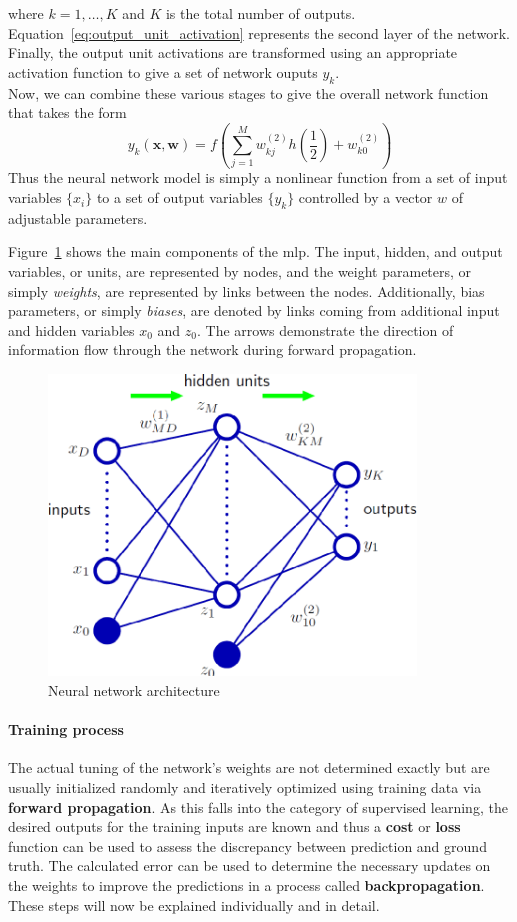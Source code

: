 where $ k = 1, \dots, K $ and $ K $ is the total number of outputs. Equation~\ref{eq:output_unit_activation} represents the second layer of the network. Finally, the output unit activations are transformed using an appropriate activation function to give a set of network ouputs $ y_k $. \\
Now, we can combine these various stages to give the overall network function that takes the form
\begin{equation}
	y_k(\pmb{x}, \pmb{w}) = f \left( \sum_{j=1}^{M} w_{kj}^{(2)} h \left( \frac{1}{2} \right) + w_{k0}^{(2)} \right)
\end{equation}
Thus the neural network model is simply a nonlinear function from a set of input variables $ \{x_i\} $ to a set of output variables $ \{y_k\} $ controlled by a vector $ w $ of adjustable parameters.

Figure~\ref{fig:neural_network_architecture} shows the main components of the \gls{mlp}. The input, hidden, and output variables, or units, are represented by nodes, and the weight parameters, or simply \textit{weights}, are represented by links between the nodes. Additionally, bias parameters, or simply \textit{biases}, are denoted by links coming from additional input and hidden variables $ x_0 $ and $ z_0 $. The arrows demonstrate the direction of information flow through the network during forward propagation.
\begin{figure}
	\includegraphics[height=8cm]{img/neural_network_structure}
	\caption{Neural network architecture}
	\label{fig:neural_network_architecture}
\end{figure}

\paragraph{Training process}\label{par:training_process}
The actual tuning of the network's weights are not determined exactly but are usually initialized randomly and iteratively optimized using training data via \textbf{forward propagation}. As this falls into the category of supervised learning, the desired outputs for the training inputs are known and thus a \textbf{cost} or \textbf{loss} function can be used to assess the discrepancy between prediction and ground truth. The calculated error can be used to determine the necessary updates on the weights to improve the predictions in a process called \textbf{backpropagation}. These steps will now be explained individually and in detail.

